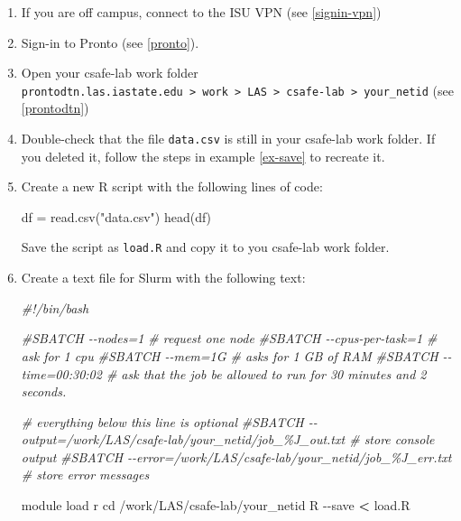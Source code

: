 \documentclass[
]{book}
\newenvironment{Shaded}{\begin{snugshade}}{\end{snugshade}}
\newcommand{\AttributeTok}[1]{\textcolor[rgb]{0.77,0.63,0.00}{#1}}
\newcommand{\BuiltInTok}[1]{#1}
\newcommand{\CommentTok}[1]{\textcolor[rgb]{0.56,0.35,0.01}{\textit{#1}}}
\newcommand{\ExtensionTok}[1]{#1}
\newcommand{\FunctionTok}[1]{\textcolor[rgb]{0.00,0.00,0.00}{#1}}
\newcommand{\NormalTok}[1]{#1}
\newcommand{\OperatorTok}[1]{\textcolor[rgb]{0.81,0.36,0.00}{\textbf{#1}}}
\newcommand{\OtherTok}[1]{\textcolor[rgb]{0.56,0.35,0.01}{#1}}
\newcommand{\StringTok}[1]{\textcolor[rgb]{0.31,0.60,0.02}{#1}}
\begin{document}
\begin{enumerate}
\def\labelenumi{\arabic{enumi}.}
\item
  If you are off campus, connect to the ISU VPN (see \ref{signin-vpn})
\item
  Sign-in to Pronto (see \ref{pronto}).
\item
  Open your csafe-lab work folder \texttt{prontodtn.las.iastate.edu\ \textgreater{}\ work\ \textgreater{}\ LAS\ \textgreater{}\ csafe-lab\ \textgreater{}\ your\_netid} (see \ref{prontodtn})
\item
  Double-check that the file \texttt{data.csv} is still in your csafe-lab work folder. If you deleted it, follow the steps in example \ref{ex-save} to recreate it.
\item
  Create a new R script with the following lines of code:

\begin{Shaded}
\begin{Highlighting}[]
\NormalTok{df }\OtherTok{=} \FunctionTok{read.csv}\NormalTok{(}\StringTok{"data.csv"}\NormalTok{)}
\FunctionTok{head}\NormalTok{(df)}
\end{Highlighting}
\end{Shaded}

  Save the script as \texttt{load.R} and copy it to you csafe-lab work folder.
\item
  Create a text file for Slurm with the following text:

\begin{Shaded}
\begin{Highlighting}[]
\CommentTok{\#!/bin/bash}

\CommentTok{\#SBATCH {-}{-}nodes=1 \# request one node}
\CommentTok{\#SBATCH {-}{-}cpus{-}per{-}task=1  \# ask for 1 cpu}
\CommentTok{\#SBATCH {-}{-}mem=1G \#  asks for 1 GB of RAM}
\CommentTok{\#SBATCH {-}{-}time=00:30:02 \# ask that the job be allowed to run for 30 minutes and 2 seconds.}

\CommentTok{\# everything below this line is optional}
\CommentTok{\#SBATCH {-}{-}output=/work/LAS/csafe{-}lab/your\_netid/job\_\%J\_out.txt \# store console output}
\CommentTok{\#SBATCH {-}{-}error=/work/LAS/csafe{-}lab/your\_netid/job\_\%J\_err.txt \# store error messages}

\ExtensionTok{module}\NormalTok{ load r}
\BuiltInTok{cd}\NormalTok{ /work/LAS/csafe{-}lab/your\_netid}
\ExtensionTok{R} \AttributeTok{{-}{-}save} \OperatorTok{\textless{}}\NormalTok{ load.R}
\end{Highlighting}
\end{Shaded}


\end{enumerate}
\end{document}
